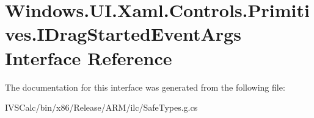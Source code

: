 \hypertarget{interface_windows_1_1_u_i_1_1_xaml_1_1_controls_1_1_primitives_1_1_i_drag_started_event_args}{}\section{Windows.\+U\+I.\+Xaml.\+Controls.\+Primitives.\+I\+Drag\+Started\+Event\+Args Interface Reference}
\label{interface_windows_1_1_u_i_1_1_xaml_1_1_controls_1_1_primitives_1_1_i_drag_started_event_args}


The documentation for this interface was generated from the following file\+:\begin{DoxyCompactItemize}
\item 
I\+V\+S\+Calc/bin/x86/\+Release/\+A\+R\+M/ilc/Safe\+Types.\+g.\+cs\end{DoxyCompactItemize}
